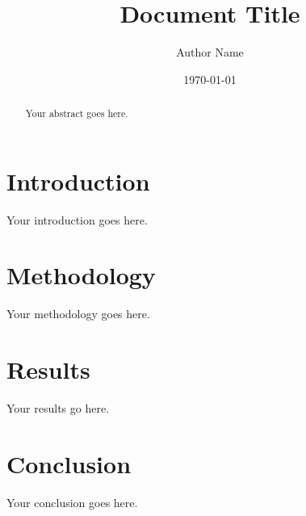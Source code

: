 \documentclass{article}
\title{Document Title}
\author{Author Name}
\date{\today}
\begin{document}
\maketitle

\begin{abstract}
Your abstract goes here.
\end{abstract}

\section{Introduction}
Your introduction goes here.

\section{Methodology}
Your methodology goes here.

\section{Results}
Your results go here.

\section{Conclusion}
Your conclusion goes here.



\end{document}

